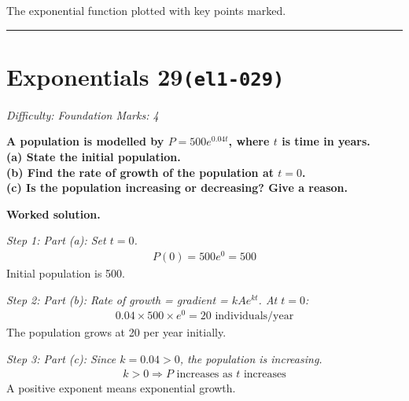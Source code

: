 \documentclass[11pt]{article}
\newcommand{\question}[1]{\par\medskip\noindent\textbf{#1}\par}
\begin{document}
\begin{center}
{
}
\end{center}
\small The exponential function plotted with key points marked.\normalsize

\medskip\hrule

\section*{Exponentials 29\quad\small\texttt{(el1-029)}}
\textit{Difficulty: Foundation \quad\textbar\quad Marks: 4}

\question{A population is modelled by \( P = 500e^{0.04t} \), where \( t \) is time in years.  \\[3pt]  (a) State the initial population.  \\[3pt]  (b) Find the rate of growth of the population at \( t = 0 \).  \\[3pt]  (c) Is the population increasing or decreasing? Give a reason.}

\textbf{Worked solution.}

\textit{Step 1: Part (a): Set \( t = 0 \).}
\[\begin{gathered}
P(0) = 500e^0 = 500
\end{gathered}\]
Initial population is 500.

\textit{Step 2: Part (b): Rate of growth = gradient = \( kA e^{kt} \). At \( t = 0 \):}
\[\begin{gathered}
0.04 \times 500 \times e^0 = 20 \text{ individuals/year}
\end{gathered}\]
The population grows at 20 per year initially.

\textit{Step 3: Part (c): Since \( k = 0.04 > 0 \), the population is increasing.}
\[\begin{gathered}
k > 0 \Rightarrow P \text{ increases as } t \text{ increases}
\end{gathered}\]
A positive exponent means exponential growth.
\end{document}
